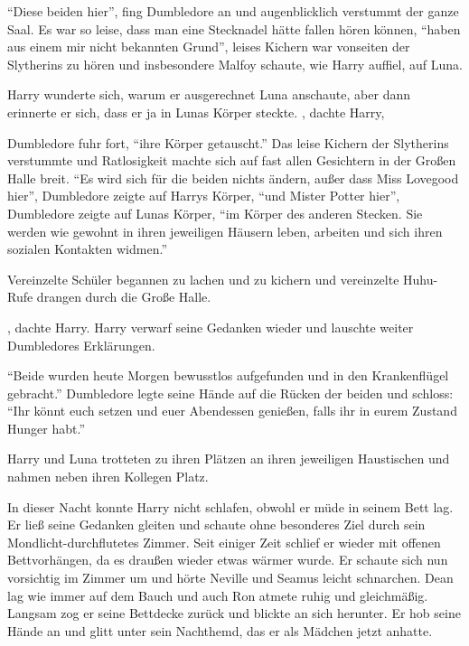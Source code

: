 \enquote{Diese beiden hier}, fing Dumbledore an und augenblicklich verstummt der ganze Saal. Es war so leise, dass man eine Stecknadel hätte fallen hören können, \enquote{haben aus einem mir nicht bekannten Grund\abs}, leises Kichern war vonseiten der Slytherins zu hören und insbesondere Malfoy schaute, wie Harry auffiel, auf Luna.

Harry wunderte sich, warum er ausgerechnet Luna anschaute, aber dann erinnerte er sich, dass er ja in Lunas Körper steckte. , dachte Harry, 

Dumbledore fuhr fort, \enquote{ihre Körper getauscht.} Das leise Kichern der Slytherins verstummte und Ratlosigkeit machte sich auf fast allen Gesichtern in der Großen Halle breit. \enquote{Es wird sich für die beiden nichts ändern, außer dass Miss Lovegood hier}, Dumbledore zeigte auf Harrys Körper, \enquote{und Mister Potter hier}, Dumbledore zeigte auf Lunas Körper, \enquote{im Körper des anderen Stecken. Sie werden wie gewohnt in ihren jeweiligen Häusern leben, arbeiten und sich ihren sozialen Kontakten widmen.}

Vereinzelte Schüler begannen zu lachen und zu kichern und vereinzelte Huhu-Rufe drangen durch die Große Halle.

, dachte Harry.  Harry verwarf seine Gedanken wieder und lauschte weiter Dumbledores Erklärungen.

\enquote{Beide wurden heute Morgen bewusstlos aufgefunden und in den Krankenflügel gebracht.} Dumbledore legte seine Hände auf die Rücken der beiden und schloss: \enquote{Ihr könnt euch setzen und euer Abendessen genießen, falls ihr in eurem Zustand Hunger habt.}

Harry und Luna trotteten zu ihren Plätzen an ihren jeweiligen Haustischen und nahmen neben ihren Kollegen Platz.

In dieser Nacht konnte Harry nicht schlafen, obwohl er müde in seinem Bett lag. Er ließ seine Gedanken gleiten und schaute ohne besonderes Ziel durch sein Mondlicht-durchflutetes Zimmer. Seit einiger Zeit schlief er wieder mit offenen Bettvorhängen, da es draußen wieder etwas wärmer wurde.  Er schaute sich nun vorsichtig im Zimmer um und hörte Neville und Seamus leicht schnarchen. Dean lag wie immer auf dem Bauch und auch Ron atmete ruhig und gleichmäßig. Langsam zog er seine Bettdecke zurück und blickte an sich herunter. Er hob seine Hände an und glitt unter sein Nachthemd, das er als Mädchen jetzt anhatte.

